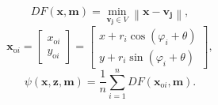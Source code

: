 \documentclass{beamer}
\begin{document}
\begin{frame}
\begin{columns}[t]
        \begin{column}[]{0.7\textwidth}
            \begin{equation}
                D F(\mathbf{x},\mathbf{m})=\min _{\mathbf{v}_{\mathbf{j}} \in V}\left\|\mathbf{x}-\mathbf{v}_{\mathbf{j}}\right\|,
            \end{equation}
            \begin{equation}\label{eq:ray-projection}
                \mathbf{x}_{\mathrm{o}i} = \begin{bmatrix}x_{\mathrm{o}i}\\y_{\mathrm{o}i}\end{bmatrix}
                = \begin{bmatrix}x + r_i\cos(\varphi_i + \theta)\\y + r_i\sin(\varphi_i + \theta)\end{bmatrix},
            \end{equation}
            \begin{equation}
                \psi(\mathbf{x},\mathbf{z},\mathbf{m}) = \frac{1}{n}\sum_{i=1}^nDF(\mathbf{x}_{\text{o}i},\mathbf{m}).
            \end{equation}
        \end{column}
    \end{columns}
\end{frame}
\end{document}
